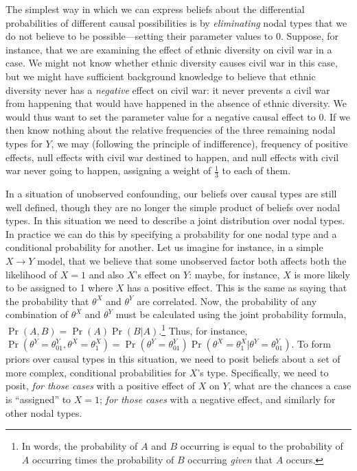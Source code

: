\documentclass[
  12pt,
]{book}
\begin{document}
The simplest way in which we can express beliefs about the differential probabilities of different causal possibilities is by \emph{eliminating} nodal types that we do not believe to be possible---setting their parameter values to \(0\). Suppose, for instance, that we are examining the effect of ethnic diversity on civil war in a case. We might not know whether ethnic diversity causes civil war in this case, but we might have sufficient background knowledge to believe that ethnic diversity never has a \emph{negative} effect on civil war: it never prevents a civil war from happening that would have happened in the absence of ethnic diversity. We would thus want to set the parameter value for a negative causal effect to \(0\). If we then know nothing about the relative frequencies of the three remaining nodal types for \(Y\), we may (following the principle of indifference), frequency of positive effects, null effects with civil war destined to happen, and null effects with civil war never going to happen, assigning a weight of \(\frac{1}{3}\) to each of them.

In a situation of unobserved confounding, our beliefs over causal types are still well defined, though they are no longer the simple product of beliefs over nodal types. In this situation we need to describe a joint distribution over nodal types. In practice we can do this by specifying a probability for one nodal type and a conditional probability for another. Let us imagine for instance, in a simple \(X \rightarrow Y\) model, that we believe that some unobserved factor both affects both the likelihood of \(X = 1\) and also \(X\)'s effect on \(Y\): maybe, for instance, \(X\) is more likely to be assigned to 1 where \(X\) has a positive effect. This is the same as saying that the probability that \(\theta^X\) and \(\theta^Y\) are correlated. Now, the probability of any combination of \(\theta^X\) and \(\theta^Y\) must be calculated using the joint probability formula, \(\Pr(A, B) = \Pr(A)\Pr(B|A)\).\footnote{In words, the probability of \(A\) and \(B\) occurring is equal to the probability of \(A\) occurring times the probability of \(B\) occurring \emph{given} that \(A\) occurs.} Thus, for instance, \(\Pr(\theta^Y = \theta^Y_{01}, \theta^X = \theta^X_1) = \Pr(\theta^Y = \theta^Y_{01})\Pr(\theta^X = \theta^X_1 | \theta^Y = \theta^Y_{01})\). To form priors over causal types in this situation, we need to posit beliefs about a set of more complex, conditional probabilities for \(X\)'s type. Specifically, we need to posit, \emph{for those cases} with a positive effect of \(X\) on \(Y\), what are the chances a case is ``assigned'' to \(X=1\); \emph{for those cases} with a negative effect, and similarly for other nodal types.
\end{document}
